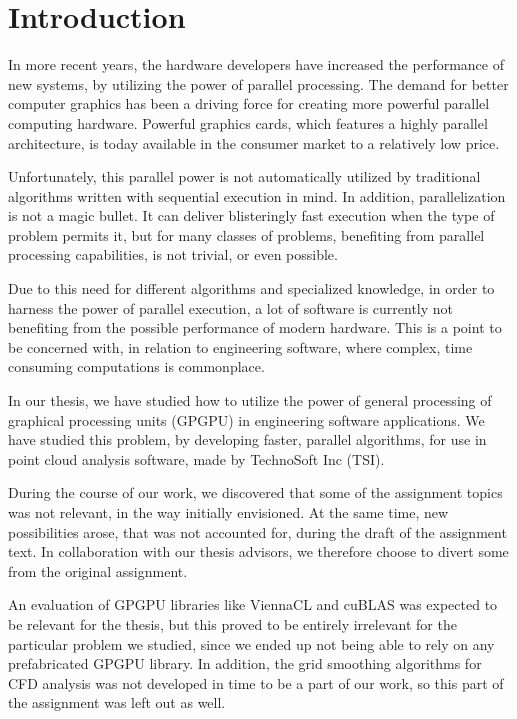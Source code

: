 \chapter{Introduction}

In more recent years, the hardware developers have increased the performance of new systems, by utilizing the power of parallel processing. The demand for better computer graphics has been a driving force for creating more powerful parallel computing hardware. Powerful graphics cards, which features a highly parallel architecture, is today available in the consumer market to a relatively low price.

Unfortunately, this parallel power is not automatically utilized by traditional algorithms written with sequential execution in mind. In addition, parallelization is not a magic bullet. It can deliver blisteringly fast execution when the type of problem permits it, but for many classes of problems, benefiting from parallel processing capabilities, is not trivial, or even possible.

Due to this need for different algorithms and specialized knowledge, in order to harness the power of parallel execution, a lot of software is currently not benefiting from the possible performance of modern hardware. This is a point to be concerned with, in relation to engineering software, where complex, time consuming computations is commonplace.

In our thesis, we have studied how to utilize the power of general processing of graphical processing units (GPGPU) in engineering software applications. We have studied this problem, by developing faster, parallel algorithms, for use in point cloud analysis software, made by TechnoSoft Inc (TSI).

During the course of our work, we discovered that some of the assignment topics was not relevant, in the way initially envisioned. At the same time, new possibilities arose, that was not accounted for, during the draft of the assignment text. In collaboration with our thesis advisors, we therefore choose to divert some from the original assignment.

An evaluation of GPGPU libraries like ViennaCL and cuBLAS was expected to be relevant for the thesis, but this proved to be entirely irrelevant for the particular problem we studied, since we ended up not being able to rely on any prefabricated GPGPU library. In addition, the grid smoothing algorithms for CFD analysis was not developed in time to be a part of our work, so this part of the assignment was left out as well.

